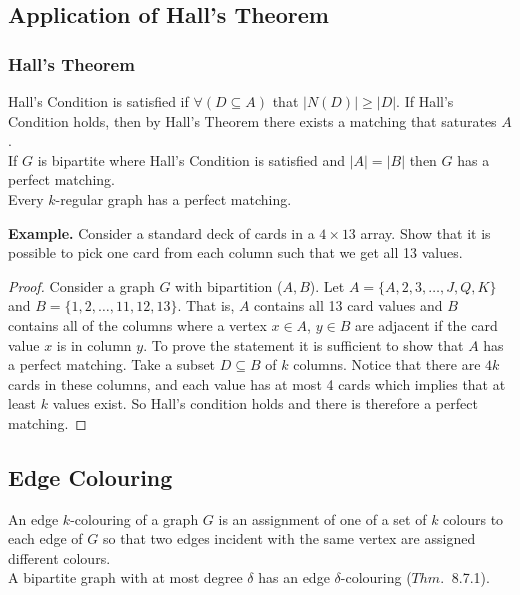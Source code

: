 \documentclass[11pt]{article}
\newenvironment{eg}[1]{
\begin{tcolorbox}[colback = white!15, arc=0pt,outer arc=0pt, colframe = black]
{\color{black} \textbf{Example.} #1} \\[5pt]
}
{
\end{tcolorbox}
}
\newcommand{\nl}{\\[5pt]}
\begin{document}
\subsection{Application of Hall's Theorem}

\subsubsection{Hall's Theorem}
Hall's Condition is satisfied if $\forall(D \subseteq A)$ 
that $|N(D)| \geq |D|$. If Hall's Condition holds, then by Hall's Theorem there exists a matching that saturates $A$. \nl
If $G$ is bipartite where Hall's Condition is satisfied and $|A| = |B|$ then $G$ has a perfect matching. \nl 
Every $k$-regular graph has a perfect matching. 
\begin{eg}{Consider a standard deck of cards in a $4 \times 13$ array. Show that it is possible to pick one card from each column such that we get all 13 values.}
\vspace{-20pt}
\begin{proof}
Consider a graph $G$ with bipartition ($A, B$). Let $A = \{A, 2, 3, \dots, J, Q, K\}$ and $B = \{1, 2, \dots, 11, 12, 13\}$. That is, $A$ contains all 13 card values and $B$ contains all of the columns where a vertex $x \in A$, $y \in B$ are adjacent if the card value $x$ is in column $y$. To prove the statement it is sufficient to show that $A$ has a perfect matching. Take a subset $D \subseteq B$ of $k$ columns. Notice that there are $4k$ cards in these columns, and each value has at most 4 cards which implies that at least $k$ values exist. So Hall's condition holds and there is therefore a perfect matching.
\end{proof}
\end{eg}

\subsection{Edge Colouring}
An edge $k$-colouring of a graph $G$ is an assignment of one of a set of $k$ colours to each edge of $G$ so that two edges incident with the same vertex are assigned different colours. \nl 
A bipartite graph with at most degree $\delta$ has an edge $\delta$-colouring ($Thm. \:$ 8.7.1). 
\end{document}
